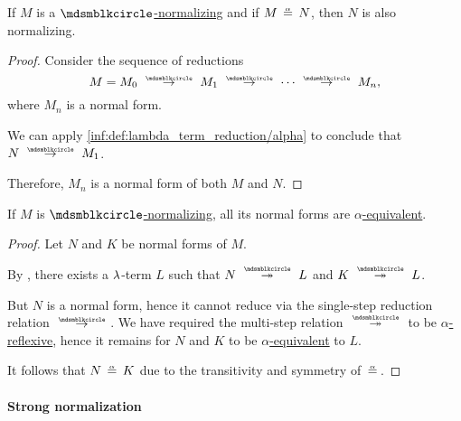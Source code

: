 \begin{proposition}\label{thm:normalization_of_alpha_equivalent_term}
  If \( M \) is a \hyperref[def:lambda_term_normal_form]{\( \Anon \)-normalizing} and if \( M \aequiv N \), then \( N \) is also normalizing.
\end{proposition}
\begin{proof}
  Consider the sequence of reductions
  \begin{equation*}
    M = M_0 \pred M_1 \pred \cdots \pred M_n,
  \end{equation*}
  where \( M_n \) is a normal form.

  We can apply \ref{inf:def:lambda_term_reduction/alpha} to conclude that \( N \pred M_1 \).

  Therefore, \( M_n \) is a normal form of both \( M \) and \( N \).
\end{proof}

\begin{proposition}\label{thm:lambda_term_normal_form_uniqueness}
  If \( M \) is \hyperref[def:lambda_term_normal_form]{\( \Anon \)-normalizing}, all its normal forms are \hyperref[def:lambda_term_alpha_equivalence]{\( \alpha \)-equivalent}.
\end{proposition}
\begin{proof}
  Let \( N \) and \( K \) be normal forms of \( M \).

  By , there exists a \( {\mathrm \lambda} \)-term \( L \) such that \( N \pred* L \) and \( K \pred* L \).

  But \( N \) is a normal form, hence it cannot reduce via the single-step reduction relation \( {\pred} \). We have required the multi-step relation \( {\pred*} \) to be \hyperref[def:alpha_reflexive]{\( \alpha \)-reflexive}, hence it remains for \( N \) and \( K \) to be \hyperref[def:lambda_term_alpha_equivalence]{\( \alpha \)-equivalent} to \( L \).

  It follows that \( N \aequiv K \) due to the transitivity and symmetry of \( {\aequiv} \).
\end{proof}

\paragraph{Strong normalization}

